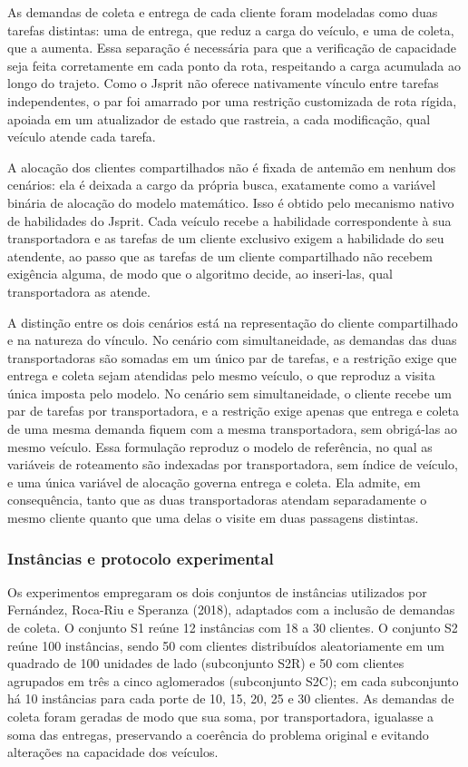 \documentclass[a4paper,12pt]{article}
\begin{document}
As demandas de coleta e entrega de cada cliente foram modeladas como duas tarefas distintas: uma de entrega, que reduz a carga do veículo, e uma de coleta, que a aumenta. Essa separação é necessária para que a verificação de capacidade seja feita corretamente em cada ponto da rota, respeitando a carga acumulada ao longo do trajeto. Como o Jsprit não oferece nativamente vínculo entre tarefas independentes, o par foi amarrado por uma restrição customizada de rota rígida, apoiada em um atualizador de estado que rastreia, a cada modificação, qual veículo atende cada tarefa.

A alocação dos clientes compartilhados não é fixada de antemão em nenhum dos cenários: ela é deixada a cargo da própria busca, exatamente como a variável binária de alocação do modelo matemático. Isso é obtido pelo mecanismo nativo de habilidades do Jsprit. Cada veículo recebe a habilidade correspondente à sua transportadora e as tarefas de um cliente exclusivo exigem a habilidade do seu atendente, ao passo que as tarefas de um cliente compartilhado não recebem exigência alguma, de modo que o algoritmo decide, ao inseri-las, qual transportadora as atende.

A distinção entre os dois cenários está na representação do cliente compartilhado e na natureza do vínculo. No cenário com simultaneidade, as demandas das duas transportadoras são somadas em um único par de tarefas, e a restrição exige que entrega e coleta sejam atendidas pelo mesmo veículo, o que reproduz a visita única imposta pelo modelo. No cenário sem simultaneidade, o cliente recebe um par de tarefas por transportadora, e a restrição exige apenas que entrega e coleta de uma mesma demanda fiquem com a mesma transportadora, sem obrigá-las ao mesmo veículo. Essa formulação reproduz o modelo de referência, no qual as variáveis de roteamento são indexadas por transportadora, sem índice de veículo, e uma única variável de alocação governa entrega e coleta. Ela admite, em consequência, tanto que as duas transportadoras atendam separadamente o mesmo cliente quanto que uma delas o visite em duas passagens distintas.

\subsubsection{Instâncias e protocolo experimental}
Os experimentos empregaram os dois conjuntos de instâncias utilizados por Fernández, Roca-Riu e Speranza (2018), adaptados com a inclusão de demandas de coleta. O conjunto S1 reúne 12 instâncias com 18 a 30 clientes. O conjunto S2 reúne 100 instâncias, sendo 50 com clientes distribuídos aleatoriamente em um quadrado de 100 unidades de lado (subconjunto S2R) e 50 com clientes agrupados em três a cinco aglomerados (subconjunto S2C); em cada subconjunto há 10 instâncias para cada porte de 10, 15, 20, 25 e 30 clientes. As demandas de coleta foram geradas de modo que sua soma, por transportadora, igualasse a soma das entregas, preservando a coerência do problema original e evitando alterações na capacidade dos veículos.
\end{document}
